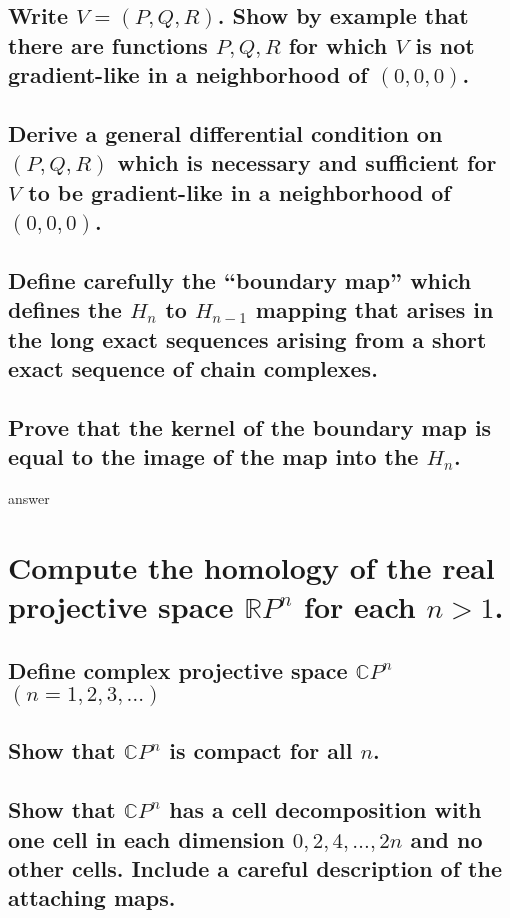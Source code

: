 \documentclass[10pt]{article}
\begin{document}
\subsection{Write $V = (P,Q,R)$. Show by example that there are functions $P,Q,R$ for which $V$ is
  not gradient-like in a neighborhood of $(0,0,0)$. }

\subsection{Derive a general differential condition on $(P,Q,R)$ which is necessary and sufficient
  for $V$ to be gradient-like in a neighborhood of $(0,0,0)$.}

\advsection{}

\subsection{Define carefully the ``boundary map'' which defines the $H_n$ to $H_{n-1}$ mapping that
  arises in the long exact sequences arising from a short exact sequence of chain complexes.}

\subsection{Prove that the kernel of the boundary map is equal to the image of the map into the $H_n$.}

answer

\section{Compute the homology of the real projective space $\mathbb{R} P^n$ for each $n > 1$.}

\advsection{}

\subsection{Define complex projective space $\mathbb{C} P^n$ $(n = 1,2,3, \dots)$}

\subsection{Show that $\mathbb{C} P^n$ is compact for all $n$.}

\subsection{Show that $\mathbb{C} P^n$ has a cell decomposition with one cell in each dimension
  $0,2,4,\dots, 2n$ and no other cells. Include a careful description of the attaching maps.}
\end{document}
